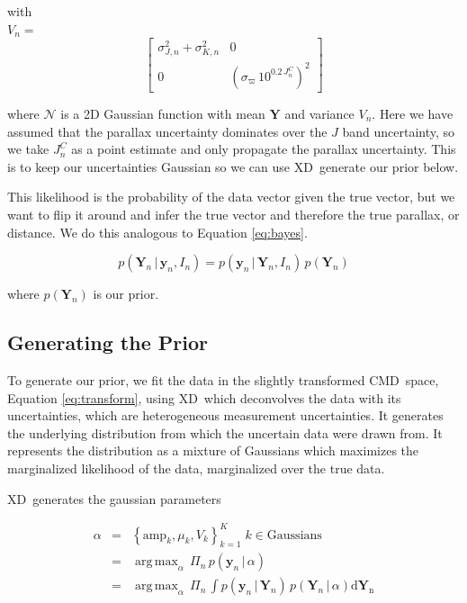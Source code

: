 \documentclass[modern]{aastex61}
\newcommand{\acronym}[1]{{\small{#1}}}
\newcommand{\xd}{\acronym{XD}}
\newcommand{\cmd}{\acronym{CMD}}
\DeclareMathOperator*{\argmax}{arg\,max}
\newcommand{\given}{\,|\,}
\begin{document}
with \\
$V_n = $
\[
\begin{bmatrix}
\sigma_{J,n}^2 + \sigma_{K,n}^2 & 0 \\
0 & (\sigma_{\varpi}\,10^{0.2\,J_n^C})^2
\end{bmatrix}
\]


where $\mathcal{N}$ is a 2D Gaussian function with mean $\mathbf{Y}$ and variance $V_n$.
Here we have assumed that the parallax uncertainty dominates over the $J$ band uncertainty, so we take $J_n^C$ as a point estimate and only propagate the parallax uncertainty. This is to keep our uncertainties Gaussian so we can use \xd\ generate our prior below.

This likelihood is the probability of the data vector given the true vector, but we
want to flip it around and infer the true vector and therefore the true parallax, or distance. We do this
analogous to Equation \ref{eq:bayes}.


\begin{equation}
p(\mathbf{Y}_n \given \mathbf{y}_n, I_n) = p(\mathbf{y}_n \given \mathbf{Y}_n, I_n) \, p(\mathbf{Y}_n)
\end{equation}

where $p(\mathbf{Y}_n)$ is our prior.

\subsection{Generating the Prior}

To generate our prior, we fit the data in the slightly transformed \cmd\ space, Equation \ref{eq:transform}, using \xd\ which deconvolves the data with its uncertainties, which are heterogeneous measurement uncertainties. It generates the underlying distribution from which the uncertain data were drawn from. It represents the distribution as a mixture of Gaussians which maximizes the marginalized likelihood of the data, marginalized over the true data.

\xd\ generates the gaussian parameters

\begin{eqnarray}
\alpha &=& \left\{\mathrm{amp}_k, \mu_k, V_k\right\}_{k=1}^K \; k \in \mathrm{Gaussians} \nonumber\\
       &=& \argmax_{\alpha} \, \Pi_n \, p(\mathbf{y}_n \given \alpha) \nonumber\\
       &=& \argmax_{\alpha} \, \Pi_n \, \int p(\mathbf{y}_n \given \mathbf{Y}_n) \, p(\mathbf{Y}_n \given \alpha)\mathrm{d\mathbf{Y}_n}
\label{eq:xdmml}
\end{eqnarray}
\end{document}
